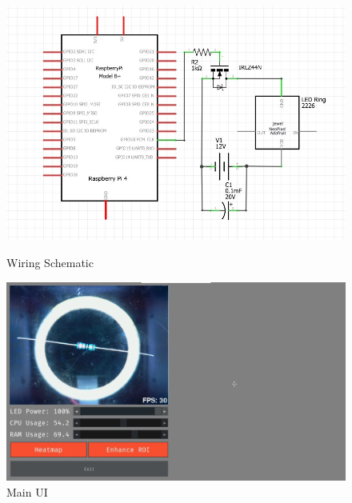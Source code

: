 
\begin{figure}
  \begin{minipage}[t]{0.49\textwidth}
    \centering
    \includegraphics[width=\textwidth]{imgs/wiring.jpg}
    \caption{Wiring Schematic} \label{fig:wiringschematic}
  \end{minipage}
  \hfill
  \begin{minipage}[t]{0.49\textwidth}
      \centering
      \includegraphics[width=\textwidth]{imgs/software/realvnc.jpg}
      \caption{Main UI}
      \label{fig:mainui}
  \end{minipage}
\end{figure}








